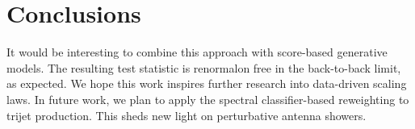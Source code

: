 \section{Conclusions}\label{sec:conclusions}

It would be interesting to combine this approach with score-based
generative models. The resulting test statistic is renormalon free in
the back-to-back limit, as expected. We hope this work inspires further
research into data-driven scaling laws. In future work, we plan to apply
the spectral classifier-based reweighting to trijet production. This
sheds new light on perturbative antenna showers.

